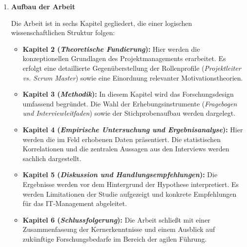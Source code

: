 \begin{enumerate}[label=\thechapter.\arabic*), leftmargin=*]
\begin{enumerate}[label=\thechapter.\arabic{enumi}.\arabic*), leftmargin=*]
\begin{enumerate}[label=\thechapter.\arabic{enumi}.\arabic{enumii}.\arabic*), leftmargin=*]
            \end{enumerate}
        \item \textbf{Aufbau der Arbeit} \par Die Arbeit ist in sechs Kapitel gegliedert, die einer logischen wissenschaftlichen Struktur folgen:
            \begin{itemize}
                \item \textbf{Kapitel 2 (\textit{Theoretische Fundierung}):} Hier werden die konzeptionellen Grundlagen des Projektmanagements erarbeitet. Es erfolgt eine detaillierte Gegenüberstellung der Rollenprofile (\textit{Projektleiter \acs{vs.} Scrum Master}) sowie eine Einordnung relevanter Motivationstheorien.
                \item \textbf{Kapitel 3 (\textit{Methodik}):} In diesem Kapitel wird das Forschungsdesign umfassend begründet. Die Wahl der Erhebungsinstrumente (\textit{Fragebogen und Interviewleitfaden}) sowie der Stichprobenaufbau werden dargelegt.
                \item \textbf{Kapitel 4 (\textit{Empirische Untersuchung und Ergebnisanalyse}):} Hier werden die im Feld erhobenen Daten präsentiert. Die statistischen Korrelationen und die zentralen Aussagen aus den Interviews werden sachlich dargestellt.
                \item \textbf{Kapitel 5 (\textit{Diskussion und Handlungsempfehlungen}):} Die Ergebnisse werden vor dem Hintergrund der Hypothese interpretiert. Es werden Limitationen der Studie aufgezeigt und konkrete Empfehlungen für das \acs{IT}-Management abgeleitet.
                \item \textbf{Kapitel 6 (\textit{Schlussfolgerung}):} Die Arbeit schließt mit einer Zusammenfassung der Kernerkenntnisse und einem Ausblick auf zukünftige Forschungsbedarfe im Bereich der agilen Führung.
            \end{itemize}
    \end{enumerate}
\end{enumerate}

